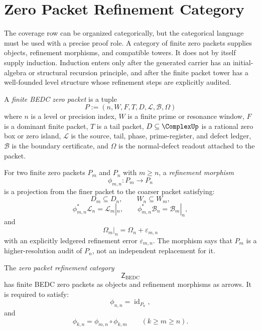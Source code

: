 \section{Zero Packet Refinement Category}
\label{sec:unified-reality-zero-packet-refinement-category}

The coverage row can be organized categorically, but the categorical
language must be used with a precise proof role.  A category of finite
zero packets supplies objects, refinement morphisms, and compatible
towers.  It does not by itself supply induction.  Induction enters only
after the generated carrier has an initial-algebra or structural
recursion principle, and after the finite packet tower has a
well-founded level structure whose refinement steps are explicitly
audited.

\begin{definition}
\label{def:unified-reality-finite-bedc-zero-packet}
A \emph{finite BEDC zero packet} is a tuple
$$
P
:=
(n,W,F,T,D,\mathcal L,\mathcal B,\Omega)
$$
where $n$ is a level or precision index, $W$ is a finite prime or
resonance window, $F$ is a dominant finite packet, $T$ is a tail packet,
$D\subseteq\ComplexUp$ is a rational zero box or zero island,
$\mathcal L$ is the source, tail, phase, prime-register, and defect
ledger, $\mathcal B$ is the boundary certificate, and $\Omega$ is the
normal-defect readout attached to the packet.
\end{definition}

\begin{definition}
\label{def:unified-reality-zero-packet-refinement-morphism}
For two finite zero packets $P_m$ and $P_n$ with $m\ge n$, a
\emph{refinement morphism}
$$
\phi_{m,n}:P_m\to P_n
$$
is a projection from the finer packet to the coarser packet satisfying:
$$
D_m\subseteq D_n,
\qquad
W_n\subseteq W_m,
$$
$$
\phi_{m,n}^{\ast}\mathcal L_n=\mathcal L_m|_n,
\qquad
\phi_{m,n}^{\ast}\mathcal B_n=\mathcal B_m|_n,
$$
and
$$
\Omega_m|_n=\Omega_n+\varepsilon_{m,n}
$$
with an explicitly ledgered refinement error $\varepsilon_{m,n}$.  The
morphism says that $P_m$ is a higher-resolution audit of $P_n$, not an
independent replacement for it.
\end{definition}

\begin{definition}
\label{def:unified-reality-zero-packet-refinement-category}
The \emph{zero packet refinement category}
$$
\mathsf Z_{\mathrm{BEDC}}
$$
has finite BEDC zero packets as objects and refinement morphisms as
arrows.  It is required to satisfy:
$$
\phi_{n,n}=\operatorname{id}_{P_n},
$$
and
$$
\phi_{k,n}=\phi_{m,n}\circ\phi_{k,m}
\qquad
(k\ge m\ge n).
$$
\end{definition}

